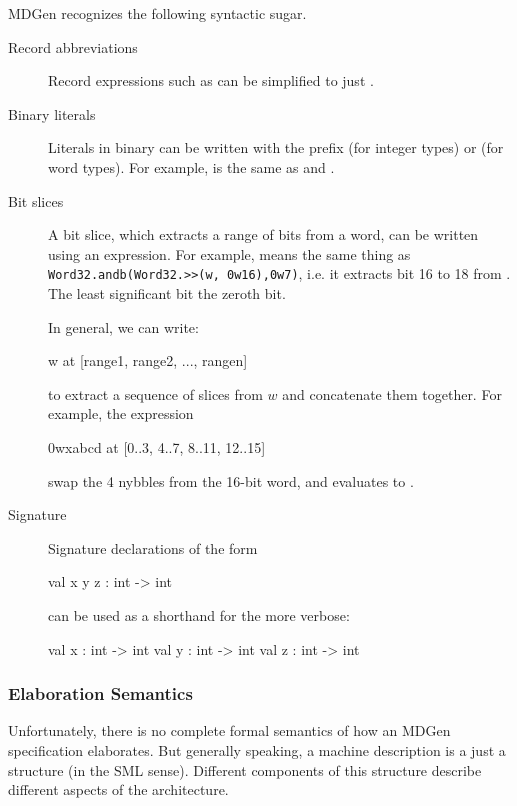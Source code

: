    MDGen recognizes the following syntactic sugar.
\begin{description}
\item[Record abbreviations]
Record expressions such as  
can be simplified to just .
\item[Binary literals]
Literals in binary can be written with the prefix  (for integer types)
or  (for word types).   For example,  is the same 
as  and .
\item[Bit slices]
   A bit slice, which extracts a range of bits from a word, can be written
using an  expression.  For example,  
means the same thing as \verb|Word32.andb(Word32.>>(w, 0w16),0w7)|, i.e.
it extracts bit 16 to 18 from .  
The least significant bit the zeroth bit. 

In general, we can write:
\begin{SML}
  w at [range1, range2, ..., rangen]
\end{SML}
to extract a sequence of slices from $w$ and concatenate them together.
For example, the expression
\begin{SML}
   0wxabcd at [0..3, 4..7, 8..11, 12..15]
\end{SML}
swap the 4 nybbles from the 16-bit word, and evaluates to .

\item[Signature]
Signature declarations of the form
\begin{SML}
   val x y z : int -> int
\end{SML}
can be used as a shorthand for the more verbose:
\begin{SML}
   val x : int -> int
   val y : int -> int
   val z : int -> int
\end{SML}
\end{description}

\subsubsection{Elaboration Semantics}

   Unfortunately, there is no complete formal semantics of how
an MDGen specification elaborates.  
   But generally speaking, a machine description is a just a structure 
(in the SML sense).   Different components of this structure describe 
different aspects of the architecture.


